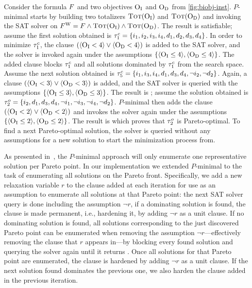\begin{example}\label{ex:pmin}
  Consider the formula $F$ and two objectives $\textsc{O}_{\text{I}}$ and $\textsc{O}_{\text{D}}$ from \cref{fig:biobj-inst}.
  $P$-minimal starts by building two totalizers $\textsc{Tot}(\textsc{O}_{\text{I}})$ and $\textsc{Tot}(\textsc{O}_{\text{D}})$ and invoking the SAT solver on $F^\text{W} = F \land \textsc{Tot}(\textsc{O}_{\text{I}}) \land \textsc{Tot}(\textsc{O}_{\text{D}})$.
  The result is satisfiable;
  assume the first solution obtained is $\tau^c_1 = \{i_1,\allowbreak i_2,\allowbreak i_3,\allowbreak i_4,\allowbreak d_1,\allowbreak d_2,\allowbreak d_3,\allowbreak d_4\}$. 
  In order to minimize $\tau^c_1$, the clause $(\langle \textsc{O}_{\text{I}} < 4 \rangle \lor \langle \textsc{O}_{\text{D}} < 4 \rangle)$ is added to the SAT solver, and the solver is invoked again under the assumptions $\{ \langle \textsc{O}_{\text{I}} \leq 4 \rangle, \langle \textsc{O}_{\text{D}} \leq 4 \rangle \}$.
  The added clause blocks $\tau^c_1$ and all solutions dominated by $\tau^c_1$ from the search space.
  Assume the next solution obtained is $\tau^c_5 = \{i_1,\allowbreak i_3,\allowbreak i_4,\allowbreak d_1,\allowbreak d_3,\allowbreak d_4,\allowbreak \lnot i_2,\allowbreak \lnot d_2\}$. 
  Again, a clause $(\langle \textsc{O}_{\text{I}} < 3 \rangle \lor \langle \textsc{O}_{\text{D}} < 3 \rangle)$ is added, and the SAT solver is queried with the assumptions $\{ \langle \textsc{O}_{\text{I}} \leq 3 \rangle, \langle \textsc{O}_{\text{D}} \leq 3 \rangle \}$.
  The result is \sat{};
  assume the solution obtained is $\tau^o_2 = \{i_2,\allowbreak d_1,\allowbreak d_3,\allowbreak d_4,\allowbreak \lnot i_1,\allowbreak \lnot i_3,\allowbreak \lnot i_4,\allowbreak \lnot d_2\}$. 
  $P$-minimal then adds the clause $(\langle \textsc{O}_{\text{I}} < 2 \rangle \lor \langle \textsc{O}_{\text{D}} < 2 \rangle)$ and invokes the solver again under the assumptions $\{ \langle \textsc{O}_{\text{I}} \leq 2 \rangle, \langle \textsc{O}_{\text{D}} \leq 2 \rangle \}$.
  The result is \unsat{} which proves that $\tau^o_2$ is Pareto-optimal. 
  To find a next Pareto-optimal solution, the solver is queried without any assumptions for a new solution to start the minimization process from.
\end{example}

As presented in~\cite{DBLP:conf/cp/SohBTB17}, the $P$-minimal approach will only enumerate one representative solution per Pareto point.
In our implementation we extended $P$-minimal to the task of enumerating all solutions on the Pareto front.
Specifically, we add a new relaxation variable $r$ to the clause added at each iteration for use as an assumption to enumerate all solutions at that Pareto point:
the next SAT solver query is done including the assumption $\lnot r$, if a dominating solution is found, the clause is made permanent, i.e., hardening it, by adding $\lnot r$ as a unit clause.
If no dominating solution is found, all solutions corresponding to the just discovered Pareto point can be enumerated when removing the assumption $\lnot r$---effectively removing the clause that $r$ appears in---by blocking every found solution and querying the solver again until it returns \unsat{}.
Once all solutions for that Pareto point are enumerated, the clause is hardened by adding $\lnot r$ as a unit clause.
If the next solution found dominates the previous one, we also harden the clause added in the previous iteration.

